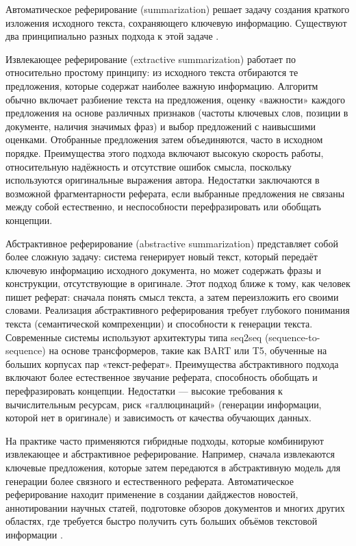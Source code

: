 \documentclass{SibFU-docs}
\begin{document}

Автоматическое реферирование (summarization) решает задачу создания краткого изложения исходного текста, сохраняющего ключевую информацию. Существуют два принципиально разных подхода к этой задаче \cite{GitHub2022Summarization, arXiv2023AbstractiveSummarization}.

Извлекающее реферирование (extractive summarization) работает по относительно простому принципу: из исходного текста отбираются те предложения, которые содержат наиболее важную информацию. Алгоритм обычно включает разбиение текста на предложения, оценку «важности» каждого предложения на основе различных признаков (частоты ключевых слов, позиции в документе, наличия значимых фраз) и выбор предложений с наивысшими оценками. Отобранные предложения затем объединяются, часто в исходном порядке. Преимущества этого подхода включают высокую скорость работы, относительную надёжность и отсутствие ошибок смысла, поскольку используются оригинальные выражения автора. Недостатки заключаются в возможной фрагментарности реферата, если выбранные предложения не связаны между собой естественно, и неспособности перефразировать или обобщать концепции.

Абстрактивное реферирование (abstractive summarization) представляет собой более сложную задачу: система генерирует новый текст, который передаёт ключевую информацию исходного документа, но может содержать фразы и конструкции, отсутствующие в оригинале. Этот подход ближе к тому, как человек пишет реферат: сначала понять смысл текста, а затем переизложить его своими словами. Реализация абстрактивного реферирования требует глубокого понимания текста (семантической компрехенции) и способности к генерации текста. Современные системы используют архитектуры типа seq2seq (sequence-to-sequence) на основе трансформеров, такие как BART или T5, обученные на больших корпусах пар «текст-реферат». Преимущества абстрактивного подхода включают более естественное звучание реферата, способность обобщать и перефразировать концепции. Недостатки — высокие требования к вычислительным ресурсам, риск «галлюцинаций» (генерации информации, которой нет в оригинале) и зависимость от качества обучающих данных.

На практике часто применяются гибридные подходы, которые комбинируют извлекающее и абстрактивное реферирование. Например, сначала извлекаются ключевые предложения, которые затем передаются в абстрактивную модель для генерации более связного и естественного реферата. Автоматическое реферирование находит применение в создании дайджестов новостей, аннотировании научных статей, подготовке обзоров документов и многих других областях, где требуется быстро получить суть больших объёмов текстовой информации \cite{MicrosoftLearn2025Summarization}.
\end{document}
